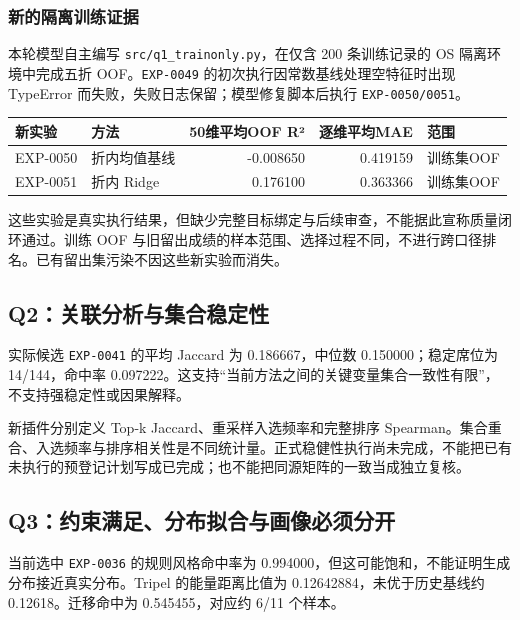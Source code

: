 \documentclass[
  a4paper,12pt]{article}
\newcounter{none} %
\begin{document}
\subsubsection{新的隔离训练证据}\label{ux65b0ux7684ux9694ux79bbux8badux7ec3ux8bc1ux636e}

本轮模型自主编写 \texttt{src/q1\_trainonly.py}，在仅含 200 条训练记录的
OS 隔离环境中完成五折 OOF。\texttt{EXP-0049}
的初次执行因常数基线处理空特征时出现 TypeError
而失败，失败日志保留；模型修复脚本后执行 \texttt{EXP-0050/0051}。

{\def\LTcaptype{none} %
\begin{longtable}[]{@{}llrrl@{}}
\toprule\noalign{}
新实验 & 方法 & 50维平均OOF R² & 逐维平均MAE & 范围 \\
\midrule\noalign{}
\endhead
\bottomrule\noalign{}
\endlastfoot
EXP-0050 & 折内均值基线 & -0.008650 & 0.419159 & 训练集OOF \\
EXP-0051 & 折内 Ridge & 0.176100 & 0.363366 & 训练集OOF \\
\end{longtable}
}

这些实验是真实执行结果，但缺少完整目标绑定与后续审查，不能据此宣称质量闭环通过。训练
OOF
与旧留出成绩的样本范围、选择过程不同，不进行跨口径排名。已有留出集污染不因这些新实验而消失。

\subsection{Q2：关联分析与集合稳定性}\label{q2ux5173ux8054ux5206ux6790ux4e0eux96c6ux5408ux7a33ux5b9aux6027}

实际候选 \texttt{EXP-0041} 的平均 Jaccard 为 0.186667，中位数
0.150000；稳定席位为 14/144，命中率
0.097222。这支持``当前方法之间的关键变量集合一致性有限''，不支持强稳定性或因果解释。

新插件分别定义 Top-k Jaccard、重采样入选频率和完整排序
Spearman。集合重合、入选频率与排序相关性是不同统计量。正式稳健性执行尚未完成，不能把已有未执行的预登记计划写成已完成；也不能把同源矩阵的一致当成独立复核。

\subsection{Q3：约束满足、分布拟合与画像必须分开}\label{q3ux7ea6ux675fux6ee1ux8db3ux5206ux5e03ux62dfux5408ux4e0eux753bux50cfux5fc5ux987bux5206ux5f00}

当前选中 \texttt{EXP-0036} 的规则风格命中率为
0.994000，但这可能饱和，不能证明生成分布接近真实分布。Tripel
的能量距离比值为 0.12642884，未优于历史基线约 0.12618。迁移命中为
0.545455，对应约 6/11 个样本。
\end{document}
